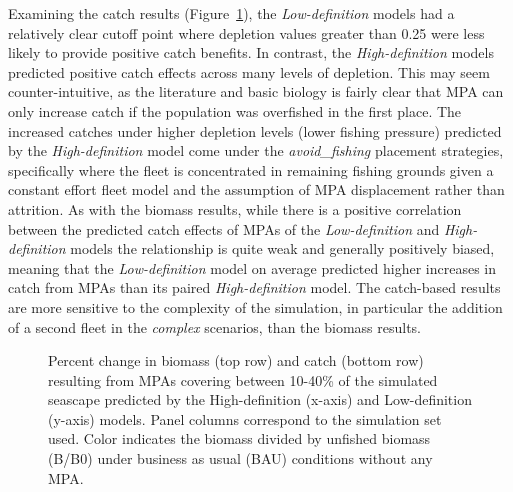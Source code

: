\documentclass[
  default,
  lineno,
  referee]{sn-jnl}
\begin{document}
Examining the catch results (Figure~\ref{fig-hi-v-low}), the
\emph{Low-definition} models had a relatively clear cutoff point where
depletion values greater than 0.25 were less likely to provide positive
catch benefits. In contrast, the \emph{High-definition} models predicted
positive catch effects across many levels of depletion. This may seem
counter-intuitive, as the literature and basic biology is fairly clear
that MPA can only increase catch if the population was overfished in the
first place. The increased catches under higher depletion levels (lower
fishing pressure) predicted by the \emph{High-definition} model come
under the \emph{avoid\_fishing} placement strategies, specifically where
the fleet is concentrated in remaining fishing grounds given a constant
effort fleet model and the assumption of MPA displacement rather than
attrition. As with the biomass results, while there is a positive
correlation between the predicted catch effects of MPAs of the
\emph{Low-definition} and \emph{High-definition} models the relationship
is quite weak and generally positively biased, meaning that the
\emph{Low-definition} model on average predicted higher increases in
catch from MPAs than its paired \emph{High-definition} model. The
catch-based results are more sensitive to the complexity of the
simulation, in particular the addition of a second fleet in the
\emph{complex} scenarios, than the biomass results.

\begin{figure}


\caption{\label{fig-hi-v-low}Percent change in biomass (top row) and
catch (bottom row) resulting from MPAs covering between 10-40\% of the
simulated seascape predicted by the High-definition (x-axis) and
Low-definition (y-axis) models. Panel columns correspond to the
simulation set used. Color indicates the biomass divided by unfished
biomass (B/B0) under business as usual (BAU) conditions without any
MPA.}

\end{figure}%
\end{document}
